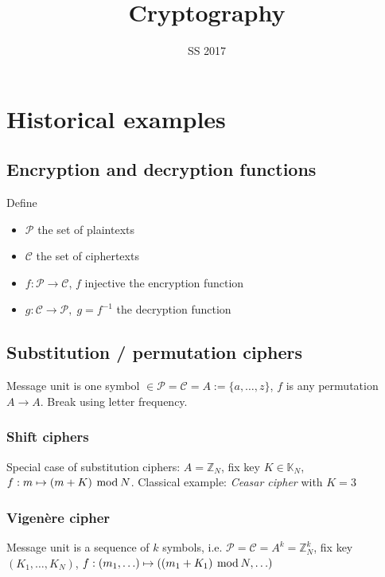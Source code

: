 \documentclass[a4paper]{scrartcl}
\title{Cryptography}
\subtitle{SS 2017}
\newcommand\Z{\mathbb Z}
\newcommand\cP{\mathcal P}
\newcommand\cC{\mathcal C}
\renewcommand\mod{\hspace*{0.4em}\mathrm{mod}\hspace*{0.2em}}
\begin{document}
\maketitle
\thispagestyle{empty}
\newpage

\tableofcontents
\newpage


\section{Historical examples}

\subsection{Encryption and decryption functions}

Define\begin{itemize}
    \item $\cP$ the set of plaintexts
    \item $\cC$ the set of ciphertexts
    \item $f: \cP \rightarrow \cC$, $f$ injective the encryption function
    \item $g: \cC \rightarrow \cP,\;g=f^{-1}$ the decryption function
\end{itemize}

\subsection{Substitution / permutation ciphers}

Message unit is one symbol $\in \cP = \cC = A := \{a,\hdots,z\}$,
$f$ is any permutation $A \rightarrow A$. Break using letter frequency.

\subsubsection{Shift ciphers}

Special case of substitution ciphers: $A = \Z_N$, fix key $K\in\mathbb K_N$,
$f: m\mapsto (m + K)\mod N$. Classical example: \textit{Ceasar cipher} with $K=3$

\subsubsection{Vigen\`ere cipher}

Message unit is a sequence of $k$ symbols, i.e. $\cP = \cC = A^k = \Z_N^k$,
fix key $(K_1,\hdots,K_N)$, $f: (m_1,\hdots)\mapsto((m_1+K_1)\mod N, \hdots)$
\end{document}
